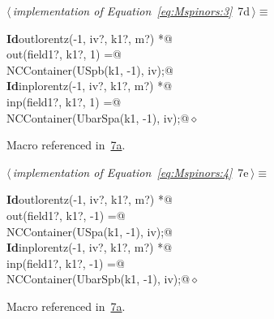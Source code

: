 \documentclass[a4paper,12pt]{amsart}
\renewcommand{\NWtarget}[2]{\hypertarget{#1}{#2}}
\renewcommand{\NWlink}[2]{\hyperlink{#1}{#2}}
\renewcommand{\NWtxtMacroRefIn}{Macro referenced in}
\renewcommand{\NWsep}{${\diamond}$}
\begin{document}
\begin{flushleft} \small
\begin{minipage}{\linewidth}\label{scrap16}\raggedright\small
\NWtarget{nuweb7d}{} $\langle\,${\itshape implementation of Equation~\eqref{eq:Mspinors:3}}\nobreak\ {\footnotesize {7d}}$\,\rangle\equiv$
\vspace{-1ex}
\begin{list}{}{} \item
\mbox{}\verb@@\hbox{\sffamily\bfseries Id}\verb@ outlorentz(-1, iv?, k1?, m?) *@\\
\mbox{}\verb@      out(field1?, k1?,  1) =@\\
\mbox{}\verb@   NCContainer(USpb(k1, -1), iv);@\\
\mbox{}\verb@@\hbox{\sffamily\bfseries Id}\verb@ inplorentz(-1, iv?, k1?, m?) *@\\
\mbox{}\verb@      inp(field1?, k1?,  1) =@\\
\mbox{}\verb@   NCContainer(UbarSpa(k1, -1), iv);@{\NWsep}
\end{list}
\vspace{-1.5ex}
\footnotesize
\begin{list}{}{\setlength{\itemsep}{-\parsep}\setlength{\itemindent}{-\leftmargin}}
\item \NWtxtMacroRefIn\ \NWlink{nuweb7a}{7a}.

\item{}
\end{list}
\end{minipage}\vspace{4ex}
\end{flushleft}
\begin{flushleft} \small
\begin{minipage}{\linewidth}\label{scrap17}\raggedright\small
\NWtarget{nuweb7e}{} $\langle\,${\itshape implementation of Equation~\eqref{eq:Mspinors:4}}\nobreak\ {\footnotesize {7e}}$\,\rangle\equiv$
\vspace{-1ex}
\begin{list}{}{} \item
\mbox{}\verb@@\hbox{\sffamily\bfseries Id}\verb@ outlorentz(-1, iv?, k1?, m?) *@\\
\mbox{}\verb@      out(field1?, k1?, -1) =@\\
\mbox{}\verb@   NCContainer(USpa(k1, -1), iv);@\\
\mbox{}\verb@@\hbox{\sffamily\bfseries Id}\verb@ inplorentz(-1, iv?, k1?, m?) *@\\
\mbox{}\verb@      inp(field1?, k1?, -1) =@\\
\mbox{}\verb@   NCContainer(UbarSpb(k1, -1), iv);@{\NWsep}
\end{list}
\vspace{-1.5ex}
\footnotesize
\begin{list}{}{\setlength{\itemsep}{-\parsep}\setlength{\itemindent}{-\leftmargin}}
\item \NWtxtMacroRefIn\ \NWlink{nuweb7a}{7a}.

\item{}
\end{list}
\end{minipage}\vspace{4ex}
\end{flushleft}
\end{document}
